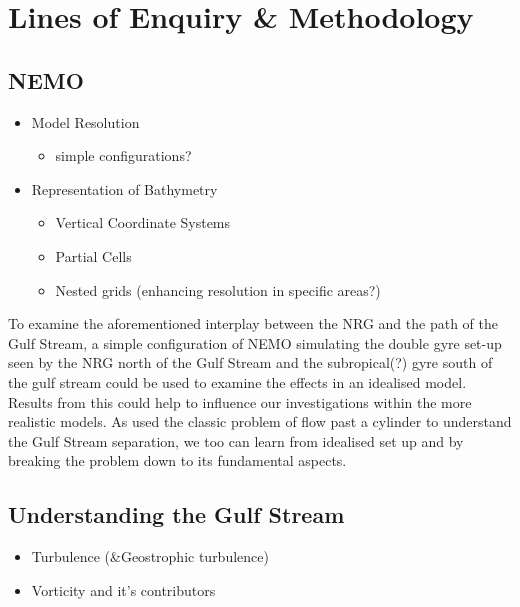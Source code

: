 \documentclass[..\EOYR.tex]{subfiles}
\begin{document}
\section{Lines of Enquiry \& Methodology}

\subsection{NEMO}
\begin{itemize}
  \item Model Resolution \citep{Ezer2016b}
  \begin{itemize}
    \item simple configurations? \citep{Tansley2001}
  \end{itemize}
  \item Representation of Bathymetry
  \begin{itemize}
    \item Vertical Coordinate Systems
    \item Partial Cells
    \item Nested grids (enhancing resolution in specific areas?) 
  \end{itemize}
\end{itemize}


To examine the aforementioned interplay between the NRG and the path of the Gulf Stream, a simple configuration of NEMO simulating the double gyre set-up seen by the NRG north of the Gulf Stream and the subropical(?) gyre south of the gulf stream could be used to examine the effects in an idealised model. Results from this could help to influence our investigations within the more realistic models. As \citep{Tansley2001} used the classic problem of flow past a cylinder to understand the Gulf Stream separation, we too can learn from idealised set up and by breaking the problem down to its fundamental aspects.

\subsection{Understanding the Gulf Stream}
\begin{itemize}
  \item Turbulence    (\&Geostrophic turbulence)
  \item Vorticity and it's contributors
\end{itemize}
  
\end{document}
